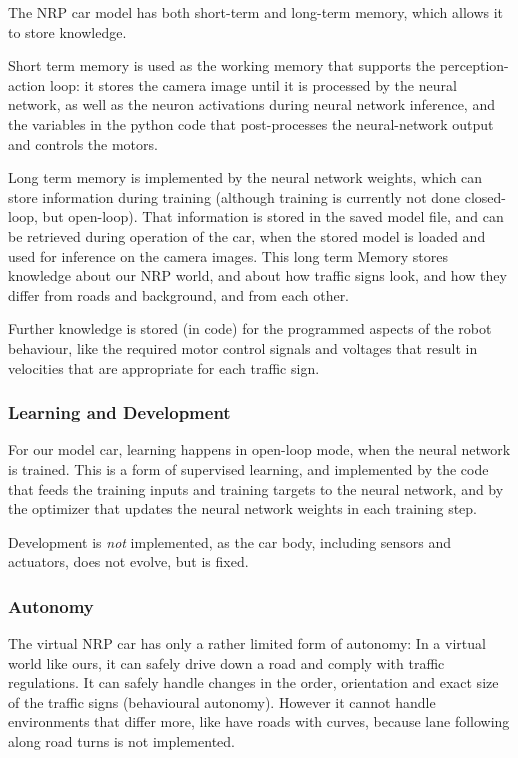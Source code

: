 The NRP car model has both short-term and long-term memory, which allows it to store knowledge.

Short term memory is used as the working memory that supports the perception-action loop: it stores the camera image until it is processed by the neural network, as well as the neuron activations during neural network inference, and the variables in the python code that post-processes the neural-network output and controls the motors.

Long term memory is implemented by the neural network weights, which can store information during training (although training is currently not done closed-loop, but open-loop). That information is stored in the saved model file, and can be retrieved during operation of the car, when the stored model is loaded and used for inference on the camera images.
This long term Memory stores knowledge about our NRP world, and about how traffic signs look, and how they differ from roads and background, and from each other.

Further knowledge is stored (in code) for the programmed aspects of the robot behaviour, like the required motor control signals and voltages that  result in velocities that are appropriate for each traffic sign.


\subsubsection{Learning and Development}
For our model car, learning happens in open-loop mode, when the neural network is trained. This is a form of supervised learning, and implemented by the code that feeds the training inputs and training targets to the neural network, and by the optimizer that updates the neural network weights in each training step.

Development is \emph{not} implemented, as the car body, including sensors and actuators, does not evolve, but is fixed.

\subsubsection{Autonomy}
The virtual NRP car has only a rather limited form of autonomy: In a virtual world like ours, it can safely drive down a road and comply with traffic regulations. It can safely handle changes in the order, orientation and exact size of the traffic signs (behavioural autonomy). However it cannot handle environments that differ more, like have roads with curves, because lane following along road turns is not implemented.

